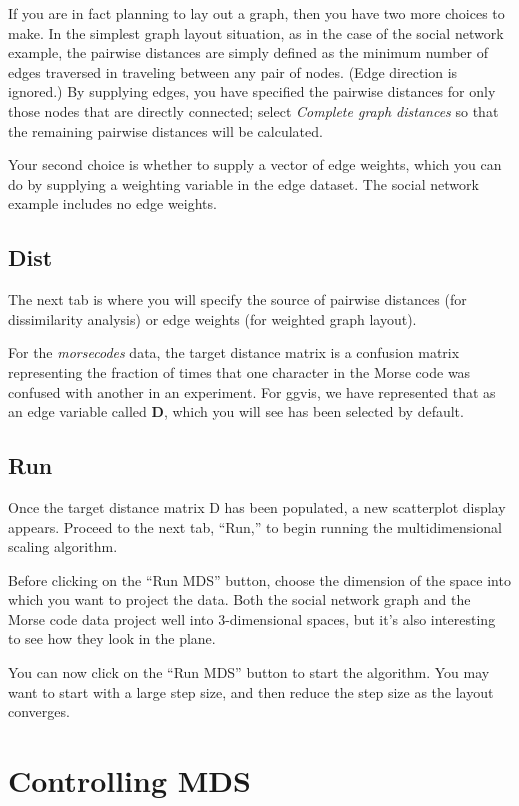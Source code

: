 \documentclass[11pt]{article}
\begin{document}
If you are in fact planning to lay out a graph, then you have two more
choices to make.  In the simplest graph layout situation, as in the
case of the social network example, the pairwise distances are simply
defined as the minimum number of edges traversed in traveling between
any pair of nodes.  (Edge direction is ignored.)  By supplying edges,
you have specified the pairwise distances for only those nodes that
are directly connected; select {\em Complete graph distances} so that
the remaining pairwise distances will be calculated.

Your second choice is whether to supply a vector of edge weights,
which you can do by supplying a weighting variable in the edge
dataset.  The social network example includes no edge weights.

\subsection{Dist}

The next tab is where you will specify the source of pairwise
distances (for dissimilarity analysis) or edge weights (for
weighted graph layout).

For the {\em morsecodes} data, the target distance matrix is a confusion
matrix representing the fraction of times that one character in the
Morse code was confused with another in an experiment.  For ggvis,
we have represented that as an edge variable called {\bf D}, which
you will see has been selected by default.

\subsection{Run}

Once the target distance matrix D has been populated, a new
scatterplot display appears.  Proceed to the next tab, ``Run,''
to begin running the multidimensional scaling algorithm.

Before clicking on the ``Run MDS'' button, choose the dimension
of the space into which you want to project the data.  Both the
social network graph and the Morse code data project well into
3-dimensional spaces, but it's also interesting to see how they
look in the plane.

You can now click on the ``Run MDS'' button to start the
algorithm.  You may want to start with a large step size, and
then reduce the step size as the layout converges.

\section {Controlling MDS}
\end{document}
